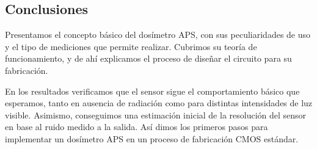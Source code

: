 \subsection{Conclusiones}
Presentamos el concepto básico del dosímetro APS,
con sus peculiaridades de uso y el tipo de mediciones que permite realizar.
Cubrimos su teoría de funcionamiento,
y de ahí explicamos el proceso de diseñar el circuito
para su fabricación.

En los resultados verificamos que el sensor
sigue el comportamiento básico que esperamos,
tanto en ausencia de radiación 
como para distintas intensidades de luz visible.
Asimismo, conseguimos una estimación inicial de la resolución del sensor
en base al ruido medido a la salida.
Así dimos los primeros pasos para implementar un dosímetro APS
en un proceso de fabricación CMOS estándar.
